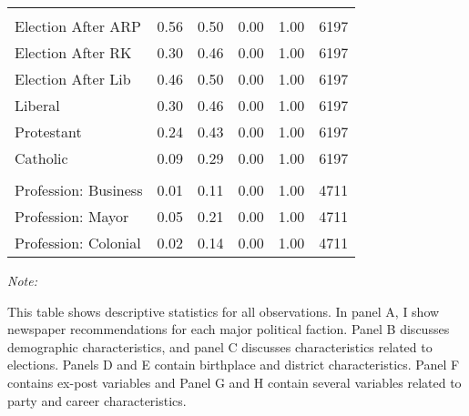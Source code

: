 \begin{table}[!h]
\begin{threeparttable}
\begin{tabular}[t]{lrrrrr}
\addlinespace[0.3em]
\multicolumn{6}{l}{\textbf{Panel G: Party and Career Characteristics}}\\
\hspace{1em}Election After ARP & \num{0.56} & \num{0.50} & \num{0.00} & \num{1.00} & 6197\\
\hspace{1em}Election After RK & \num{0.30} & \num{0.46} & \num{0.00} & \num{1.00} & 6197\\
\hspace{1em}Election After Lib & \num{0.46} & \num{0.50} & \num{0.00} & \num{1.00} & 6197\\
\hspace{1em}Liberal & \num{0.30} & \num{0.46} & \num{0.00} & \num{1.00} & 6197\\
\hspace{1em}Protestant & \num{0.24} & \num{0.43} & \num{0.00} & \num{1.00} & 6197\\
\hspace{1em}Catholic & \num{0.09} & \num{0.29} & \num{0.00} & \num{1.00} & 6197\\
\addlinespace[0.3em]
\multicolumn{6}{l}{\textbf{Panel H: Career Paths}}\\
\hspace{1em}Profession: Business & \num{0.01} & \num{0.11} & \num{0.00} & \num{1.00} & 4711\\
\hspace{1em}Profession: Mayor & \num{0.05} & \num{0.21} & \num{0.00} & \num{1.00} & 4711\\
\hspace{1em}Profession: Colonial & \num{0.02} & \num{0.14} & \num{0.00} & \num{1.00} & 4711\\
\bottomrule
\end{tabular}
\begin{tablenotes}[para]
\item \textit{Note: } 
\item This table shows descriptive statistics for all observations. In panel A, I show newspaper recommendations for each major political faction. Panel B discusses demographic characteristics, and panel C discusses characteristics related to elections. Panels D and E contain birthplace and district characteristics. Panel F contains ex-post variables and Panel G and H contain several variables related to party and career characteristics.
\end{tablenotes}
\end{threeparttable}
\end{table}
